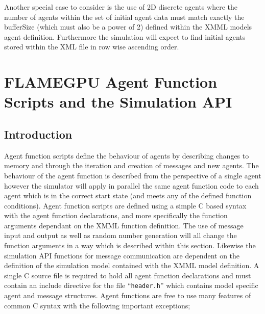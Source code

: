 \documentclass[11pt, a4paper, onecolumn, oneside]{report}
\begin{document}
Another special case to consider is the use of 2D discrete agents where the number of agents within the set of initial agent data must match exactly the bufferSize (which must also be a power of 2) defined within the XMML models agent definition.
Furthermore the simulation will expect to find initial agents stored within the XML file in row wise ascending order.

\chapter{FLAMEGPU Agent Function Scripts and the Simulation API}
\label{ch:3}
\section{Introduction}
\label{sec:31}



Agent function scripts define the behaviour of agents by describing changes to memory and through the iteration and creation of messages and new agents.
The behaviour of the agent function is described from the perspective of a single agent however the simulator will apply in parallel the same agent function code to each agent which is in the correct start state (and meets any of the defined function conditions).
Agent function scripts are defined using a simple C based syntax with the agent function declarations, and more specifically the function arguments dependant on the XMML function definition.
The use of message input and output as well as random number generation will all change the function arguments in a way which is described within this section.
Likewise the simulation API functions for message communication are dependent on the definition of the simulation model contained with the XMML model definition.
A single C source file is required to hold all agent function declarations and must contain an include directive for the file ``\texttt{header.h}'' which contains model specific agent and message structures.
Agent functions are free to use many features of common C syntax with the following important exceptions; 
\end{document}
